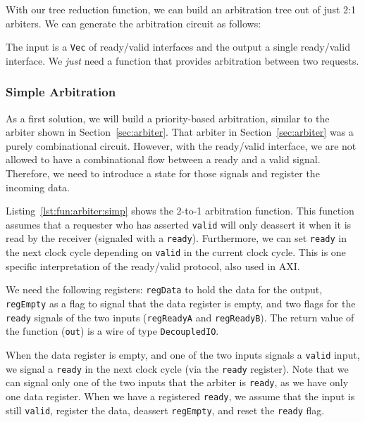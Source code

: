 \documentclass[%
    10pt,
    headinclude, footinclude=false,
    openright, %
    notitlepage,
    cleardoublepage=empty,
    headsepline,
    numbers=noenddot,
    bibliography=totoc, index=totoc,
    ]{scrbook}
\newcommand{\code}[1]{{\lstinline[basicstyle=\small\ttfamily]{#1}}}
\begin{document}
With our tree reduction function, we can build an arbitration tree out of just 2:1 arbiters.
We can generate the arbitration circuit as follows:


\noindent The input is a \code{Vec} of ready/valid interfaces and the output a single ready/valid
interface. We \emph{just} need a function that provides arbitration between two requests.



\subsubsection{Simple Arbitration}

As a first solution, we will build a priority-based arbitration, similar to the arbiter shown
in Section~\ref{sec:arbiter}. That arbiter in Section~\ref{sec:arbiter} was a purely combinational circuit.
However, with the ready/valid interface, we are not allowed to have a combinational
flow between a ready and a valid signal. Therefore, we need to introduce a state for those signals
and register the incoming data.

Listing~\ref{lst:fun:arbiter:simp} shows the 2-to-1 arbitration function. This function assumes
that a requester who has asserted \code{valid} will only deassert it when it is read by the receiver
(signaled with a \code{ready}). Furthermore, we can set \code{ready} in the next clock cycle
depending on \code{valid} in the current clock cycle.
This is one specific interpretation of the ready/valid protocol, also used in AXI.


We need the following registers: \code{regData} to hold the data for the output, \code{regEmpty} as a  flag to
signal that the data register is empty, and two flags for the \code{ready} signals of the two inputs
(\code{regReadyA} and \code{regReadyB}).
The return value of the function (\code{out}) is a wire of type \code{DecoupledIO}.

When the data register is empty, and one of the two inputs signals a \code{valid} input,
we signal a \code{ready} in the next clock cycle (via the \code{ready} register).
Note that we can signal only one of the two inputs that the arbiter is \code{ready},
as we have only one data register.
When we have a registered \code{ready}, we assume that the input is still \code{valid},
register the data, deassert \code{regEmpty}, and reset the \code{ready} flag.
\end{document}
